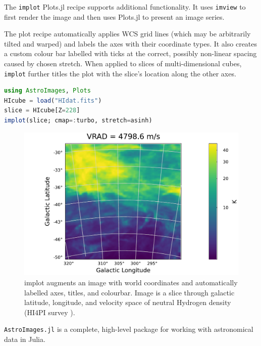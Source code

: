 \documentclass{juliacon}
\begin{document}
The \verb|implot| Plots.jl recipe supports additional functionality. It uses \verb|imview| to first render the image and then uses Plots.jl to present an image series.

The plot recipe automatically applies WCS grid lines (which may be arbitrarily tilted and warped) and labels the axes with their coordinate types. It also creates a custom colour bar labelled with ticks at the correct, possibly non-linear spacing caused by chosen stretch.
When applied to slices of multi-dimensional cubes, \verb|implot| further titles the plot with the slice's location along the other axes.

\begin{lstlisting}[language = Julia]
using AstroImages, Plots
HIcube = load("HIdat.fits")
slice = HIcube[Z=228]
implot(slice; cmap=:turbo, stretch=asinh)
\end{lstlisting}
\vspace{-0.5cm}
\begin{figure}[hbt!]
    \centerline{\includegraphics[width=\columnwidth]{hidatplot.pdf}}
    \caption{implot augments an image with world coordinates and automatically labelled axes, titles, and colourbar. Image is a slice through galactic latitude, longitude, and velocity space of neutral Hydrogen density (HI4PI survey \cite{HI4PI}).}
      \label{fig:cube-slice}
\end{figure}
\FloatBarrier 

\verb|AstroImages.jl| is a complete, high-level package for working with astronomical data in Julia.


\end{document}
